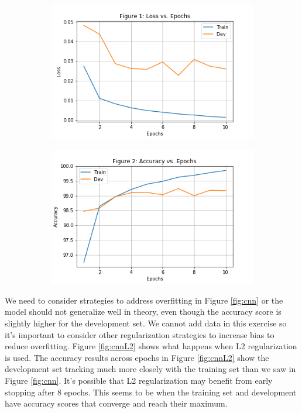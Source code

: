 \documentclass[a4paper,12pt]{article} %
\begin{document}
\begin{figure}[h]
  \centering
  \caption{CNN with Batch Norm}
  \label{fig:cnn}
  \begin{subfigure}[h]{0.45\textwidth}
    \includegraphics[width=\textwidth]{fig1}
  \end{subfigure}
  \begin{subfigure}[h]{0.45\textwidth}
    \includegraphics[width=\textwidth]{fig2}
  \end{subfigure}
\end{figure}

We need to consider strategies to address overfitting in Figure \ref{fig:cnn}
or the model should not generalize well in theory, even though the accuracy
score is slightly higher for the development set. We cannot add data in this
exercise so it's important to consider other regularization strategies to
increase bias to reduce overfitting. Figure \ref{fig:cnnL2} shows what happens
when L2 regularization is used. The accuracy results across epochs in
Figure \ref{fig:cnnL2} show the development set tracking much more closely
with the training set than we saw in Figure \ref{fig:cnn}. It's possible that
L2 regularization may benefit from early stopping after 8 epochs. This
seems to be when the training set and development have accuracy scores
that converge and reach their maximum. \newline
\end{document}
